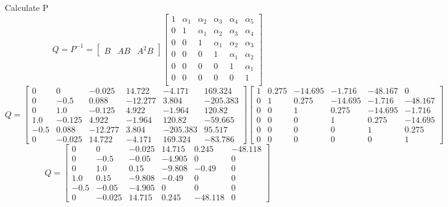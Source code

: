 Calculate P
\begin{equation}
 Q = P^{-1} = 
  \begin{bmatrix} B & AB & A^2B \end{bmatrix}
  \begin{bmatrix}
    1 & \alpha_1 & \alpha_2 & \alpha_3 & \alpha_4 & \alpha_5\\
    0 & 1 & \alpha_1 & \alpha_2 & \alpha_3 & \alpha_4\\
    0 & 0 & 1 & \alpha_1 & \alpha_2 & \alpha_3\\
    0 & 0 & 0 & 1 & \alpha_1 & \alpha_2\\
    0 & 0 & 0 & 0 & 1 & \alpha_1\\
    0 & 0 & 0 & 0 & 0 & 1\\
  \end{bmatrix}
\end{equation}\begin{equation}
  Q = \left[\begin{matrix}0 & 0 & -0.025 & 14.722 & -4.171 & 169.324\\0 & -0.5 & 0.088 & -12.277 & 3.804 & -205.383\\0 & 1.0 & -0.125 & 4.922 & -1.964 & 120.82\\1.0 & -0.125 & 4.922 & -1.964 & 120.82 & -59.665\\-0.5 & 0.088 & -12.277 & 3.804 & -205.383 & 95.517\\0 & -0.025 & 14.722 & -4.171 & 169.324 & -83.786\end{matrix}\right]\left[\begin{matrix}1 & 0.275 & -14.695 & -1.716 & -48.167 & 0\\0 & 1 & 0.275 & -14.695 & -1.716 & -48.167\\0 & 0 & 1 & 0.275 & -14.695 & -1.716\\0 & 0 & 0 & 1 & 0.275 & -14.695\\0 & 0 & 0 & 0 & 1 & 0.275\\0 & 0 & 0 & 0 & 0 & 1\end{matrix}\right]
\end{equation}
\begin{equation}
  Q = \left[\begin{matrix}0 & 0 & -0.025 & 14.715 & 0.245 & -48.118\\0 & -0.5 & -0.05 & -4.905 & 0 & 0\\0 & 1.0 & 0.15 & -9.808 & -0.49 & 0\\1.0 & 0.15 & -9.808 & -0.49 & 0 & 0\\-0.5 & -0.05 & -4.905 & 0 & 0 & 0\\0 & -0.025 & 14.715 & 0.245 & -48.118 & 0\end{matrix}\right]
\end{equation}
